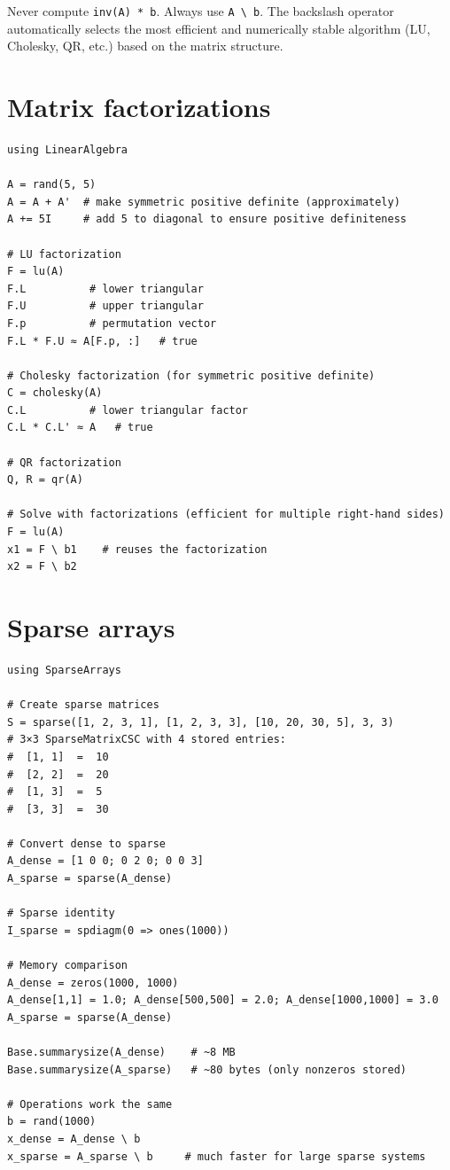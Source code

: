 \begin{warningbox}
Never compute \texttt{inv(A) * b}. Always use \texttt{A \textbackslash{} b}. The backslash operator automatically selects the most efficient and numerically stable algorithm (LU, Cholesky, QR, etc.) based on the matrix structure.
\end{warningbox}

\section{Matrix factorizations}

\begin{verbatim}
using LinearAlgebra

A = rand(5, 5)
A = A + A'  # make symmetric positive definite (approximately)
A += 5I     # add 5 to diagonal to ensure positive definiteness

# LU factorization
F = lu(A)
F.L          # lower triangular
F.U          # upper triangular
F.p          # permutation vector
F.L * F.U ≈ A[F.p, :]   # true

# Cholesky factorization (for symmetric positive definite)
C = cholesky(A)
C.L          # lower triangular factor
C.L * C.L' ≈ A   # true

# QR factorization
Q, R = qr(A)

# Solve with factorizations (efficient for multiple right-hand sides)
F = lu(A)
x1 = F \ b1    # reuses the factorization
x2 = F \ b2
\end{verbatim}

\section{Sparse arrays}

\begin{verbatim}
using SparseArrays

# Create sparse matrices
S = sparse([1, 2, 3, 1], [1, 2, 3, 3], [10, 20, 30, 5], 3, 3)
# 3×3 SparseMatrixCSC with 4 stored entries:
#  [1, 1]  =  10
#  [2, 2]  =  20
#  [1, 3]  =  5
#  [3, 3]  =  30

# Convert dense to sparse
A_dense = [1 0 0; 0 2 0; 0 0 3]
A_sparse = sparse(A_dense)

# Sparse identity
I_sparse = spdiagm(0 => ones(1000))

# Memory comparison
A_dense = zeros(1000, 1000)
A_dense[1,1] = 1.0; A_dense[500,500] = 2.0; A_dense[1000,1000] = 3.0
A_sparse = sparse(A_dense)

Base.summarysize(A_dense)    # ~8 MB
Base.summarysize(A_sparse)   # ~80 bytes (only nonzeros stored)

# Operations work the same
b = rand(1000)
x_dense = A_dense \ b
x_sparse = A_sparse \ b     # much faster for large sparse systems
\end{verbatim}

